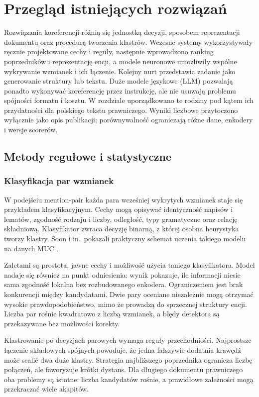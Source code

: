 \chapter{Przegląd istniejących rozwiązań}
\label{chap:przeglad}

Rozwiązania koreferencji różnią się jednostką decyzji, sposobem reprezentacji dokumentu oraz procedurą tworzenia klastrów. Wczesne systemy wykorzystywały ręcznie projektowane cechy i reguły, następnie wprowadzono ranking poprzedników i reprezentację encji, a modele neuronowe umożliwiły wspólne wykrywanie wzmianek i ich łączenie. Kolejny nurt przedstawia zadanie jako generowanie struktury lub tekstu. Duże modele językowe (LLM) pozwalają ponadto wykonywać koreferencję przez instrukcję, ale nie usuwają problemu spójności formatu i kosztu. W rozdziale uporządkowano te rodziny pod kątem ich przydatności dla polskiego tekstu prawniczego. Wyniki liczbowe przytoczono wyłącznie jako opis publikacji; porównywalność ograniczają różne dane, enkodery i wersje scorerów.

\section{Metody regułowe i statystyczne}
\label{sec:metody-klasyczne}

\subsection{Klasyfikacja par wzmianek}

W podejściu mention-pair każda para wcześniej wykrytych wzmianek staje się przykładem klasyfikacyjnym. Cechy mogą opisywać identyczność napisów i lematów, zgodność rodzaju i liczby, odległość, typy gramatyczne oraz relację składniową. Klasyfikator zwraca decyzję binarną, z której osobna heurystyka tworzy klastry. Soon i in.\ pokazali praktyczny schemat uczenia takiego modelu na danych MUC \cite{soon_2001_machine}.

Zaletami są prostota, jawne cechy i możliwość użycia taniego klasyfikatora. Model nadaje się również na punkt odniesienia: wynik pokazuje, ile informacji niesie sama zgodność lokalna bez rozbudowanego enkodera. Ograniczeniem jest brak konkurencji między kandydatami. Dwie pary oceniane niezależnie mogą otrzymać wysokie prawdopodobieństwo, mimo że prowadzą do sprzecznej struktury encji. Liczba par rośnie kwadratowo z liczbą wzmianek, a błędy detektora są przekazywane bez możliwości korekty.

Klastrowanie po decyzjach parowych wymaga reguły przechodniości. Najprostsze łączenie składowych spójnych powoduje, że jedna fałszywie dodatnia krawędź może scalić dwa duże klastry. Strategia najbliższego poprzednika ogranicza liczbę połączeń, ale faworyzuje krótki dystans. Dla długiego dokumentu prawniczego oba problemy są istotne: liczba kandydatów rośnie, a prawidłowe zależności mogą przekraczać wiele akapitów.

